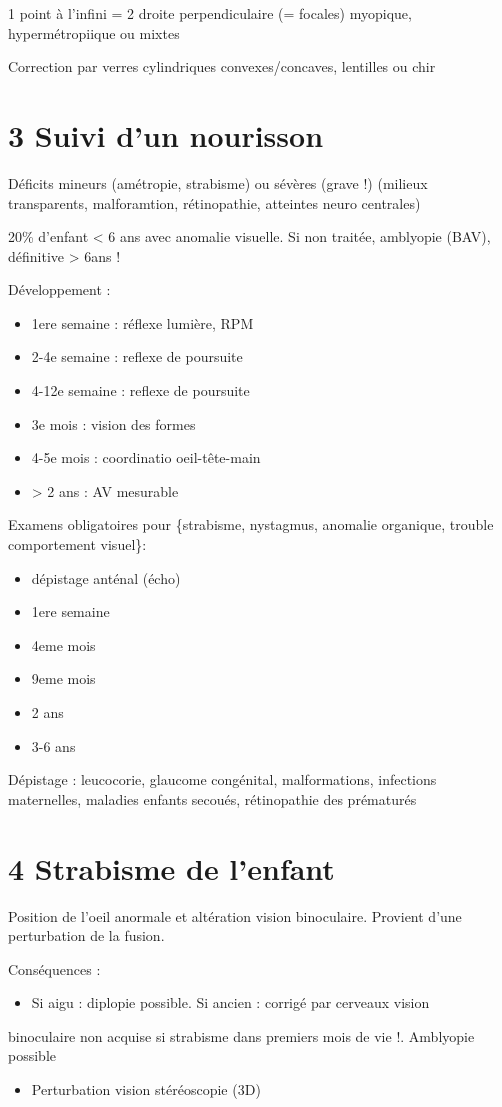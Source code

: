 \documentclass[11pt]{article}
\begin{document}
1 point à l'infini = 2 droite perpendiculaire (= focales) \thus myopique,
hypermétropiique ou mixtes

Correction par verres cylindriques convexes/concaves, lentilles ou chir

\section{3 Suivi d'un nourisson}
\label{sec:org746be0d}
Déficits mineurs (amétropie, strabisme) ou sévères (grave !) (milieux transparents,
  malforamtion, rétinopathie, atteintes neuro centrales)

20\% d'enfant < 6 ans avec anomalie visuelle. Si non traitée, amblyopie (BAV),
définitive > 6ans !

Développement :
\begin{itemize}
\item 1ere semaine : réflexe lumière, RPM
\item 2-4e semaine : reflexe de poursuite
\item 4-12e semaine : reflexe de poursuite
\item 3e mois : vision des formes
\item 4-5e mois : coordinatio oeil-tête-main
\item > 2 ans : AV mesurable
\end{itemize}
Examens obligatoires pour \{strabisme, nystagmus, anomalie organique, trouble
comportement visuel\}:
\begin{itemize}
\item dépistage anténal (écho)
\item 1ere semaine
\item 4eme mois
\item 9eme mois
\item 2 ans
\item 3-6 ans
\end{itemize}

Dépistage : leucocorie, glaucome congénital, malformations, infections
maternelles, maladies enfants secoués, rétinopathie des prématurés
\section{4 Strabisme de l'enfant}
\label{sec:org20b9c61}

Position de l'oeil anormale et altération vision binoculaire. Provient d'une
perturbation de la fusion.

Conséquences :
\begin{itemize}
\item Si aigu : diplopie possible. Si ancien : corrigé par cerveaux \thus vision
\end{itemize}
binoculaire non acquise si strabisme dans premiers mois de vie !. Amblyopie
possible
\begin{itemize}
\item Perturbation vision stéréoscopie (3D)
\end{itemize}
\end{document}
